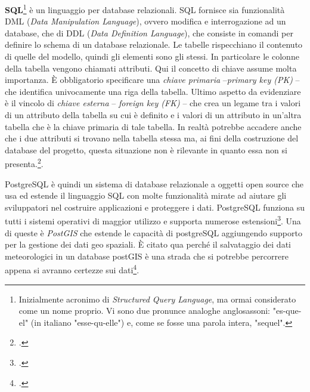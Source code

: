 \documentclass[./main.tex]{subfiles}
\begin{document}
\textbf{SQL}\footnote{Inizialmente acronimo di \textit{Structured Query Language}, ma ormai considerato come un nome proprio. Vi sono due pronunce analoghe anglosassoni: "es-que-el" (in italiano "esse-qu-elle") e, come se fosse una parola intera, "sequel".} è un linguaggio per database relazionali. SQL fornisce sia funzionalità DML (\textit{Data Manipulation Language}), ovvero modifica e interrogazione ad un database, che di DDL (\textit{Data Definition Language}), che consiste in comandi per definire lo schema di un database relazionale. Le tabelle rispecchiano il contenuto di quelle del modello, quindi gli elementi sono gli stessi. In particolare le colonne della tabella vengono chiamati attributi. Qui il concetto di chiave assume molta importanza. È obbligatorio specificare una \textit{chiave primaria} --\textit{primary key (PK)} -- che identifica univocamente una riga della tabella. Ultimo aspetto da evidenziare è il vincolo di \textit{chiave esterna} -- \textit{foreign key (FK)} -- che crea un legame tra i valori di un attributo della tabella su cui è definito e i valori di un attributo in un'altra tabella che è la chiave primaria di tale tabella. In realtà potrebbe accadere anche che i due attributi si trovano nella tabella stessa ma, ai fini della costruzione del database del progetto, questa situazione non è rilevante in quanto essa non si presenta.\footcite[89-100]{basi-di-dati-ed4}.\par

PostgreSQL è quindi un sistema di database relazionale a oggetti open source che usa ed estende il linguaggio SQL con molte funzionalità mirate ad aiutare gli sviluppatori nel costruire applicazioni e proteggere i dati. PostgreSQL funziona su tutti i sistemi operativi di maggior utilizzo e supporta numerose estensioni\footcite[\url{https://www.postgresql.org/about/}]{website-postgres}. Una di queste è \textit{PostGIS} che estende le capacità di postgreSQL aggiungendo supporto per la gestione dei dati geo spaziali. È citato qua perché il salvataggio dei dati meteorologici in un database postGIS è una strada che si potrebbe percorrere appena si avranno certezze sui dati\footcite[\url{https://postgis.net/}]{website-postgis}.
\end{document}

